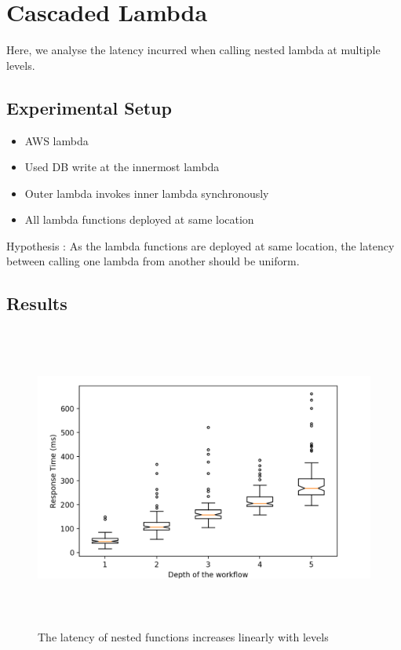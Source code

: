 \section{Cascaded Lambda}

Here, we analyse the latency incurred when calling nested lambda at multiple levels.

\subsection{Experimental Setup}
\begin{itemize}
    \item AWS lambda
    \item Used DB write at the innermost lambda
    \item Outer lambda invokes inner lambda synchronously
    \item All lambda functions deployed at same location
\end{itemize}

Hypothesis : As the lambda functions are deployed at same location, the latency between calling one lambda from another should be uniform.

\subsection{Results}

\begin{figure}[ht]
\centering
\includegraphics[height=10cm]{Images/5.png}
\caption{The latency of nested functions increases linearly with levels}
\end{figure}


